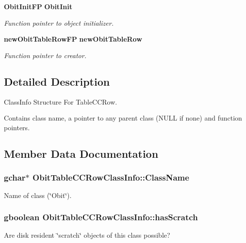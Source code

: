 \begin{CompactItemize}
{\bf Obit\-Init\-FP} {\bf Obit\-Init}
\begin{CompactList}\small\item\em Function pointer to object initializer. \item\end{CompactList}\item 
{\bf new\-Obit\-Table\-Row\-FP} {\bf new\-Obit\-Table\-Row}
\begin{CompactList}\small\item\em Function pointer to creator. \item\end{CompactList}\end{CompactItemize}


\subsection{Detailed Description}
Class\-Info Structure For Table\-CCRow. 

Contains class name, a pointer to any parent class (NULL if none) and function pointers. 



\subsection{Member Data Documentation}
\subsubsection{\setlength{\rightskip}{0pt plus 5cm}gchar$\ast$ {\bf Obit\-Table\-CCRow\-Class\-Info::Class\-Name}}\label{structObitTableCCRowClassInfo_o2}


Name of class (\char`\"{}Obit\char`\"{}). 

\subsubsection{\setlength{\rightskip}{0pt plus 5cm}gboolean {\bf Obit\-Table\-CCRow\-Class\-Info::has\-Scratch}}\label{structObitTableCCRowClassInfo_o1}


Are disk resident \char`\"{}scratch\char`\"{} objects of this class possible? 

